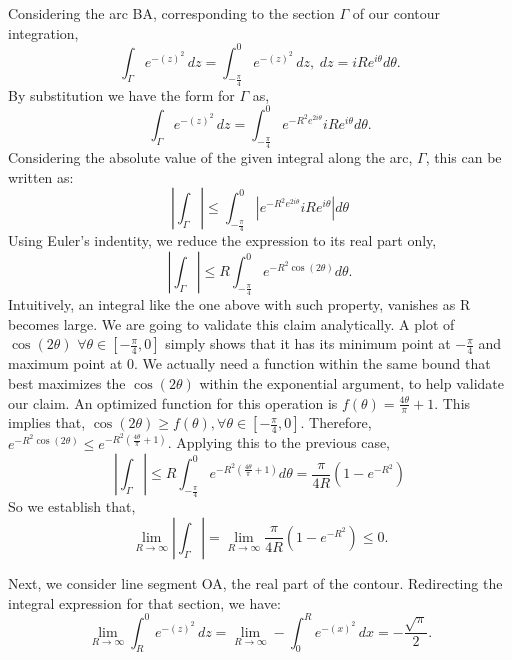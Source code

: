 \documentclass[conference]{IEEEtran}
\begin{document}
Considering the arc BA, corresponding to the section $\Gamma$ of our contour integration,
\begin{equation}
    \int_{\Gamma} e^{-(z)^{2}} \, dz = \int_{-\frac{\pi}{4}}^{0} e^{-(z)^{2}} \, dz, \hspace{3pt} dz = iRe^{i\theta} d \theta. 
\end{equation}
By substitution we have the form for $\Gamma$ as,
\begin{equation}
    \int_{\Gamma} e^{-(z)^{2}} \, dz = \int_{-\frac{\pi}{4}}^{0} e^{-R^{2}e^{2i\theta}} iRe^{i\theta} d\theta. 
\end{equation}
Considering the absolute value of the given integral along the arc, $\Gamma$, this can be written as:
\begin{equation}
   \left| \int_{\Gamma} \right| \leq \int_{-\frac{\pi}{4}}^{0} \left|e^{-R^{2}e^{2i\theta}} iRe^{i\theta}\right| d\theta
\end{equation}
Using Euler's indentity, we reduce the expression to its real part only,
\begin{equation}
   \left| \int_{\Gamma} \right| \leq R\int_{-\frac{\pi}{4}}^{0}e^{-R^{2}\cos(2\theta)}d\theta.
\end{equation}
Intuitively, an integral like the one above with such property, vanishes as R becomes large. We are going to validate this claim analytically. A plot of $\cos(2\theta)$ $\forall \theta \in [-\frac{\pi}{4}, 0]$ simply shows that it has its minimum point at $-\frac{\pi}{4}$ and maximum point at $0$. We actually need a function within the same bound that best maximizes the $\cos(2\theta)$ within the exponential argument, to help validate our claim. An optimized function for this operation is $f(\theta) = \frac{4\theta}{\pi}+1$. This implies that, $\cos(2\theta) \geq f(\theta), \forall \theta \in [-\frac{\pi}{4}, 0]$.
Therefore, $e^{-R^{2}\cos(2\theta)} \leq e^{-R^{2}(\frac{4\theta}{\pi}+1)}$. Applying this to the previous case, 
\begin{equation}
   \left| \int_{\Gamma} \right| \leq R\int_{-\frac{\pi}{4}}^{0}e^{-R^{2}(\frac{4\theta}{\pi}+1)}d\theta = \frac{\pi}{4R}(1 - e^{-R^{2}})
\end{equation}
So we establish that, 
\begin{equation}
\lim_{{R \to \infty}} \left| \int_{\Gamma} \right| = \lim_{{R \to \infty}} \frac{\pi}{4R}(1 - e^{-R^{2}}) \leq 0.
\end{equation}

Next, we consider line segment OA, the real part of the contour. Redirecting the integral expression for that section, we have:
\begin{equation}
 \lim_{{R \to \infty}} \int_{R}^{0} e^{-(z)^{2}} \, dz = \lim_{{R \to \infty}} - \int_{0}^{R} e^{-(x)^{2}} \, dx  = -\frac{\sqrt{\pi}}{2}.
\end{equation}
\end{document}
